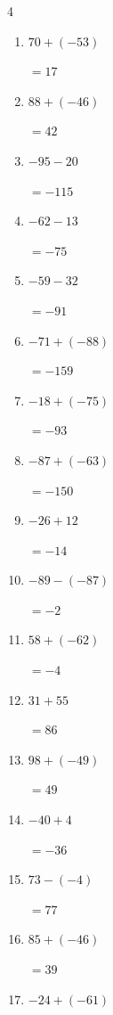 \begin{multicols}{4}
\begin{enumerate}
  \item $70+(-53)$

        $=17$

  \item $88+(-46)$

        $=42$

  \item $-95-20$

        $=-115$

  \item $-62-13$

        $=-75$

  \item $-59-32$

        $=-91$

  \item $-71+(-88)$

        $=-159$

  \item $-18+(-75)$

        $=-93$

  \item $-87+(-63)$

        $=-150$

  \item $-26+12$

        $=-14$

  \item $-89-(-87)$

        $=-2$

  \item $58+(-62)$

        $=-4$

  \item $31+55$

        $=86$

  \item $98+(-49)$

        $=49$

  \item $-40+4$

        $=-36$

  \item $73-(-4)$

        $=77$

\columnbreak %

  \item $85+(-46)$

        $=39$

  \item $-24+(-61)$


\end{enumerate}
\end{multicols}
